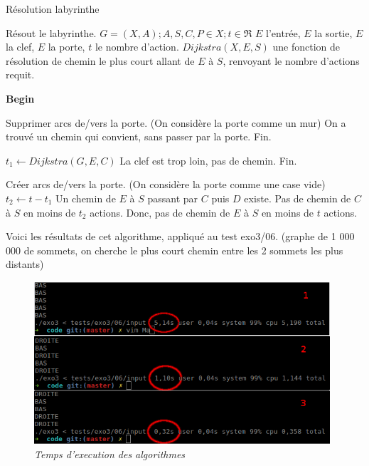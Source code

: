 \documentclass[10pt]{article}
\begin{document}
		\begin{algorithm}
			\caption{Résolution labyrinthe}
			\begin{algorithmic}
				\ENSURE Résout le labyrinthe.
				\REQUIRE $G = (X, A) ; A, S, C, P \in X ; t \in \Re$
						$E$ l'entrée, $E$ la sortie, $E$ la clef, $E$ la porte,
						$t$ le nombre d'action.
						$Dijkstra(X, E, S)$ une fonction de résolution de chemin le plus court allant de $E$ à $S$,
						renvoyant le nombre d'actions requit.\newline
				
				\textbf{Begin}
				
				\STATE Supprimer arcs de/vers la porte. (On considère la porte comme un mur)
					\STATE On a trouvé un chemin qui convient, sans passer par la porte. Fin.
				\ENDIF
				
				\STATE $t_1 \leftarrow Dijkstra(G, E, C)$
					\STATE La clef est trop loin, pas de chemin. Fin.
				\ENDIF
				
				\STATE Créer arcs de/vers la porte. (On considère la porte comme une case vide)
				\STATE $t_2 \leftarrow t - t_1$
					\PRINT Un chemin de $E$ à $S$ passant par $C$ puis $D$ existe.
				\ELSE
					\PRINT Pas de chemin de $C$ à $S$ en moins de $t_2$ actions.
					\PRINT Donc, pas de chemin de $E$ à $S$ en moins de $t$ actions.
				\ENDIF
			\end{algorithmic}
		\end{algorithm}

		\newpage
		Voici les résultats de cet algorithme, appliqué au test exo3/06. (graphe de 1 000 000 de sommets,
		on cherche le plus court chemin entre les 2 sommets les plus distants)
	
		\begin{figure}[H]
			\begin{center}
				\includegraphics[width=11cm,height=\textheight,keepaspectratio]{./images/performances.png}
			\end{center}
			\caption{\textit{Temps d'execution des algorithmes}}
		\end{figure}
		
\end{document}
